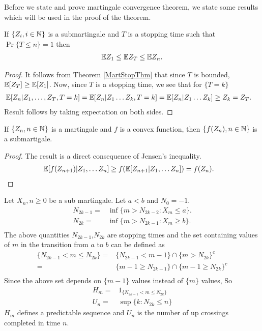 \documentclass[a4paper,10pt,english]{article}
\begin{document}
Before we state and prove martingale convergence theorem, we state some results which will be used in the proof of the theorem.
\begin{lem}
\label{StoppingTimeBound}
If $\{Z_i, i \in \mathbb{N} \}$ is  a submartingale and $T$ is a stopping time such that $\Pr\{T \leq n\}=1$ then
\begin{align*}
 \mathbb{E} Z_1 \leq \mathbb{E} Z_T \leq \mathbb{E} Z_n.
\end{align*}
\end{lem}
\begin{proof}
It follows from Theorem \ref{MartStopThm} that since $T$ is bounded, $\mathbb{E}[Z_T] \geq \mathbb{E}[Z_1]$. Now, since $T$ is a stopping time, we see that for $\{T = k\}$
\begin{align*}
\mathbb{E}[Z_n|Z_1, \hdots ,Z_T,T=k]&=\mathbb{E}[Z_n|Z_1 \hdots Z_k,T=k] = \mathbb{E}[Z_n|Z_1 \hdots Z_k] \geq Z_k = Z_T.
\end{align*}
Result follows by taking expectation on both sides.
\end{proof}
\begin{lem}
\label{ConvexFuncSubmart}
If $\{Z_n,n \in \mathbb{N}\}$ is a martingale and $f$ is a convex function, then $\{f(Z_n),n \in \mathbb{N}\}$ is a submartigale.
\end{lem}
\begin{proof}
The result is a direct consequence of Jensen's inequality.
\begin{align*}
\mathbb{E}[f(Z_{n+1})|Z_1, \hdots Z_n] &\geq f(\mathbb{E}[Z_{n+1}|Z_1, \hdots Z_n])=f(Z_n).
\end{align*}
\end{proof}
\begin{con}
	Let ${X_n,n\geq0}$ be a sub martingale. Let $a< b$ and $N_0  = -1$.
	   \begin{align*}
		N_{2k-1}=&\inf\{m>N_{2k-2}:X_m\leq a \}.\\
		N_{2k}=&\inf\{m>N_{2k-1}:X_m\geq b \}.\\
		\end{align*}
		The above quantities $N_{2k-1}$,$N_{2k}$ are stopping times and the set containing values of $m$ in the transition from $a$ to $b$ can be defined as
		\begin{align*}
		\{N_{2k-1}<m\leq N_{2k} \}=&\{N_{2k-1}<m-1\} \cap \{m>N_{2k}\}^{c}\\
		=&\{m-1\geq N_{2k-1}\}\cap\{m-1\geq N_{2k}\}^{c}\\		
		\end{align*}
		Since the above set depends on $\{m-1\}$ values instead of $\{m\}$ values, So
		\begin{align*}
			H_m=&1_{\{N_{2k-1}<m\leq  N_{2k}\}}\\
			U_n=&\sup\{k:N_{2k}\leq n\}
		\end{align*}
		 $H_m$ defines a predictable sequence and $U_n$ is the number of up crossings completed in time $n$.
\end{con}
\end{document}
